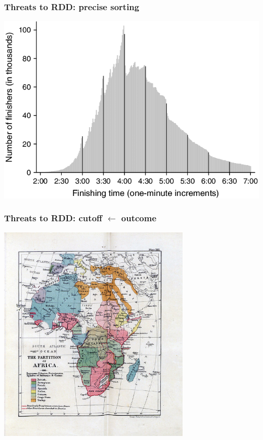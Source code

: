 \documentclass[aspectratio=43]{beamer}
\begin{document}
\begin{frame}
\frametitle{Threats to RDD: precise sorting}
\centering

\includegraphics[width = \textwidth]{../img/marathon_finishing_times}

\end{frame}

\begin{frame}
\frametitle{Threats to RDD: cutoff $\leftarrow$ outcome}
\centering

\includegraphics[width = 0.7\textwidth]{../img/partition_africa}

\end{frame}
\end{document}
